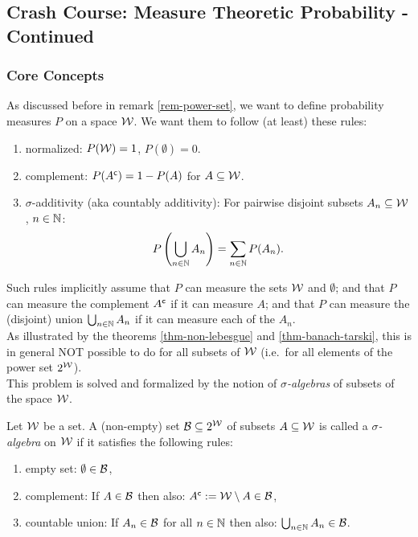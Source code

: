 \subsection*{Crash Course: Measure Theoretic Probability - Continued}%

\subsubsection{Core Concepts}

\begin{Motivation}
    As discussed before in remark \ref{rem-power-set}, we want to define probability measures $P$ on a space $\mathcal{W}$. We want them to follow (at least) these rules:
    \begin{enumerate}[label=\roman*)]
        \item normalized: $P(\mathcal{W})=1$, $P(\emptyset)=0$.
        \item complement: $P(A^{\mathsf{c}}) = 1 - P(A)$ for $A \subseteq \mathcal{W}$.
        \item $\sigma$-additivity (aka countably additivity): For pairwise disjoint subsets $A_n \subseteq \mathcal{W}$, $n \in \mathbb{N}$:
    \[P\left (\bigcup_{n \in \mathbb{N}} A_n\right ) = \sum_{n \in \mathbb{N}} P(A_n).\]
    \end{enumerate}
    Such rules implicitly assume that $P$ can measure the sets $\mathcal{W}$ and $\emptyset$; 
    and that $P$ can measure the complement $A^{\mathsf{c}}$ if it can measure $A$; 
    and that $P$ can measure the (disjoint) union $\bigcup_{n \in \mathbb{N}} A_n$ if it can measure each of the $A_n$.\\
    As illustrated by the theorems \ref{thm-non-lebesgue} and \ref{thm-banach-tarski}, this is in general NOT possible to do for all subsets of $\mathcal{W}$ (i.e.\ for all elements of the power set $2^{\mathcal{W}}$).\\
    This problem is solved and formalized by the notion of \emph{$\sigma$-algebras} of subsets of the space $\mathcal{W}$.
\end{Motivation}




\begin{Def}
    \label{def-sigma-algebra}
    Let $\mathcal{W}$ be a set. A (non-empty) set $\mathcal{B} \subseteq 2^{\mathcal{W}}$ of subsets $A \subseteq \mathcal{W}$ is called a 
    \emph{$\sigma$-algebra} on $\mathcal{W}$ if it satisfies the following rules:
    \begin{enumerate}[label=\roman*)]
        \item empty set: $\emptyset \in \mathcal{B}$,
        \item complement: If $A \in \mathcal{B}$ then also: $A^{\mathsf{c}}:= \mathcal{W}\setminus A \in \mathcal{B}$,
        \item countable union: If $A_n \in \mathcal{B}$ for all $n \in \mathbb{N}$ then also: $\bigcup_{n \in \mathbb{N}} A_n \in \mathcal{B}$.
    \end{enumerate}
\end{Def}

